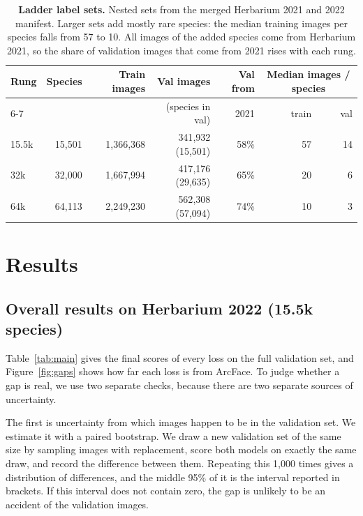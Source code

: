 \documentclass[11pt]{article}
\begin{document}
\begin{table}[t]
\centering
\small
\caption{\textbf{Ladder label sets.} Nested sets from the merged Herbarium 2021 and 2022
manifest. Larger sets add mostly rare species: the median training images per species
falls from 57 to 10. All images of the added species come from Herbarium 2021, so the
share of validation images that come from 2021 rises with each rung.}
\label{tab:ladder-data}
\footnotesize
\begin{tabular}{@{}lrrrrrr@{}}
\toprule
Rung & Species & Train images & Val images & Val from & \multicolumn{2}{c}{Median images / species} \\
\cmidrule(l){6-7}
 & & & (species in val) & 2021 & train & val \\
\midrule
15.5k & 15{,}501 & 1{,}366{,}368 & 341{,}932 (15{,}501) & 58\% & 57 & 14 \\
32k   & 32{,}000 & 1{,}667{,}994 & 417{,}176 (29{,}635) & 65\% & 20 & 6 \\
64k   & 64{,}113 & 2{,}249{,}230 & 562{,}308 (57{,}094) & 74\% & 10 & 3 \\
\bottomrule
\end{tabular}
\end{table}

\section{Results}
\label{sec:results}

\subsection{Overall results on Herbarium 2022 (15.5k species)}
\label{sec:res-coarse}

Table~\ref{tab:main} gives the final scores of every loss on the full validation set,
and Figure~\ref{fig:gaps} shows how far each loss is from ArcFace. To judge whether a gap
is real, we use two separate checks, because there are two separate sources of
uncertainty.

The first is uncertainty from which images happen to be in the validation set. We
estimate it with a paired bootstrap. We draw a new validation set of the same size by
sampling images with replacement, score both models on exactly the same draw, and record
the difference between them. Repeating this 1{,}000 times gives a distribution of
differences, and the middle 95\% of it is the interval reported in brackets. If this
interval does not contain zero, the gap is unlikely to be an accident of the validation
images.
\end{document}

